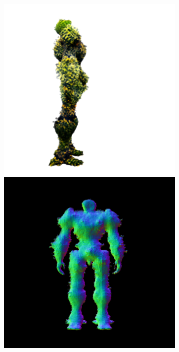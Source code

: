 \begin{figure}[ht]
\begin{subfigure}[b]{0.222\textwidth}
        \includegraphics[width=\textwidth]{etc/a robot made out of plants/magic123/magic123_coarse_robot_right_5000_part1.png}
        \includegraphics[width=\textwidth]{etc/a robot made out of plants/magic123/magic123_coarse_robot_back_5000_part2.png}

\end{subfigure}
\end{figure}
